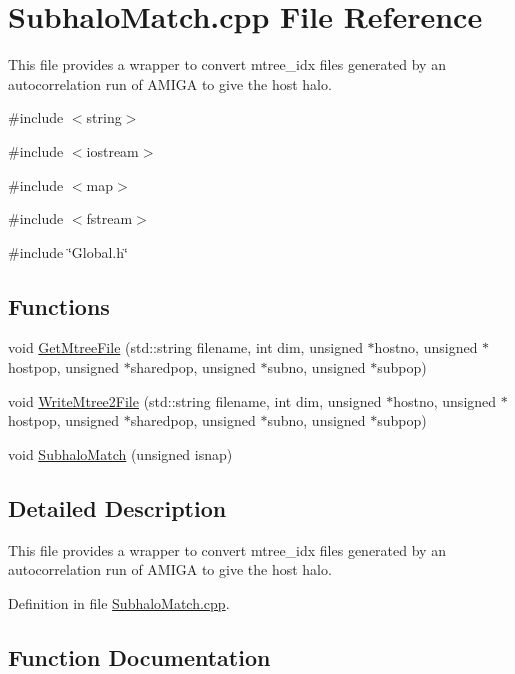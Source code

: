\section{SubhaloMatch.cpp File Reference}
\label{SubhaloMatch_8cpp}


This file provides a wrapper to convert mtree\_\-idx files generated by an autocorrelation run of AMIGA to give the host halo.  


{\ttfamily \#include $<$string$>$}\par
{\ttfamily \#include $<$iostream$>$}\par
{\ttfamily \#include $<$map$>$}\par
{\ttfamily \#include $<$fstream$>$}\par
{\ttfamily \#include \char`\"{}Global.h\char`\"{}}\par
\subsection*{Functions}
\begin{DoxyCompactItemize}
\item 
void \hyperlink{SubhaloMatch_8cpp_ae34577f1a286844fa56a04e4b24ec05e}{GetMtreeFile} (std::string filename, int dim, unsigned $\ast$hostno, unsigned $\ast$hostpop, unsigned $\ast$sharedpop, unsigned $\ast$subno, unsigned $\ast$subpop)
\item 
void \hyperlink{SubhaloMatch_8cpp_a17a904dce21502eb2b5503075c28340c}{WriteMtree2File} (std::string filename, int dim, unsigned $\ast$hostno, unsigned $\ast$hostpop, unsigned $\ast$sharedpop, unsigned $\ast$subno, unsigned $\ast$subpop)
\item 
void \hyperlink{SubhaloMatch_8cpp_a3d5bcfb515b1e1099036e4e60a70dccb}{SubhaloMatch} (unsigned isnap)
\end{DoxyCompactItemize}


\subsection{Detailed Description}
This file provides a wrapper to convert mtree\_\-idx files generated by an autocorrelation run of AMIGA to give the host halo. 

Definition in file \hyperlink{SubhaloMatch_8cpp_source}{SubhaloMatch.cpp}.



\subsection{Function Documentation}
